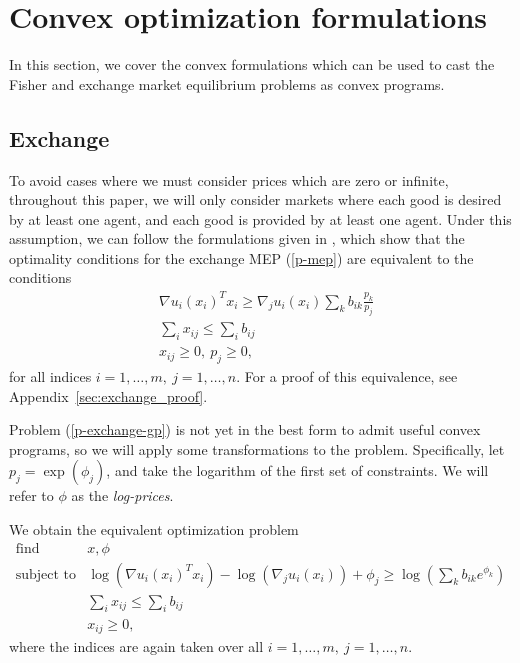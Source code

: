 \documentclass[12pt]{article}
\begin{document}
\section{Convex optimization formulations}
\label{sec:convex_form}
In this section, we cover the convex formulations which can be used to cast
the Fisher and exchange market equilibrium problems as convex programs.

\subsection{Exchange}
\label{sec:convex_form_exchange}

To avoid cases where we must consider prices which are zero or infinite, throughout this paper, we will only consider markets where each good is desired by at least one agent, and each good is provided by at least one agent.
Under this assumption, we can follow the formulations given in \cite{jain2007polynomial, chen2007note, nenakov1983algorithm}, which show that the optimality conditions for 
the exchange MEP (\ref{p-mep}) are equivalent to the conditions
\begin{equation}
\begin{array}{ll}
& \nabla u_i(x_i)^T x_i \geq  \nabla_j u_i(x_i) \sum_k b_{ik} \frac{p_k}{p_j}\\
& \sum_i x_{ij} \leq \sum_i b_{ij}\\
& x_{ij} \geq 0,\ p_j \geq 0,
\end{array}
\label{p-exchange-gp}
\end{equation}
for all indices $i=1,\ldots,m,\ j=1,\ldots,n$.
For a proof of this equivalence, see Appendix~\ref{sec:exchange_proof}.

Problem (\ref{p-exchange-gp}) is not yet in the best form to admit useful convex programs, so we will apply some transformations to the
problem.
Specifically, let $p_j = \exp(\phi_j)$, and take the logarithm of
the first set of constraints.
We will refer to $\phi$ as the \emph{log-prices}.

We obtain the equivalent optimization problem
\begin{equation}
\label{p-exchange}
\begin{array}{ll}
\mbox{find} & x, \phi \\
\mbox{subject to} & \log(\nabla u_i(x_i)^T x_i) - \log(\nabla_j u_i(x_i)) + \phi_j 
\geq \log(\sum_k b_{ik} e^{\phi_k})\\
& \sum_i x_{ij} \leq \sum_i b_{ij}\\
& x_{ij} \geq 0,
\end{array}
\end{equation}
where the indices are again taken over all $i=1,\ldots,m,\ j=1,\ldots,n$.
\end{document}
